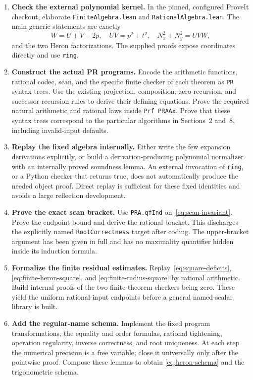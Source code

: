 \documentclass[11pt,a4paper]{article}
\theoremstyle{definition}
\newcommand{\code}[1]{\texttt{\small #1}}
\numberwithin{equation}{section}
\begin{document}
\begin{enumerate}
\item \textbf{Check the external polynomial kernel.}
In the pinned, configured ProveIt checkout, elaborate
\code{FiniteAlgebra.lean} and \code{RationalAlgebra.lean}.
The main generic statements are exactly
\[
 W=U+V-2p,\quad UV=p^2+t^2,\quad
 N_x^2+N_y^2=UVW,
\]
and the two Heron factorizations. The supplied proofs expose
coordinates directly and use \code{ring}.

\item \textbf{Construct the actual PR programs.}
Encode the arithmetic functions, rational codec, scan, and the
specific finite checker of each theorem as \code{PR} syntax trees.
Use the existing projection, composition, zero-recursion, and
successor-recursion rules to derive their defining equations.
Prove the required natural arithmetic and rational laws inside
\code{Prf PRAAx}. Prove that these syntax trees correspond to the
particular algorithms in Sections~2 and~8, including invalid-input
defaults.

\item \textbf{Replay the fixed algebra internally.}
Either write the few expansion derivations explicitly, or build a
derivation-producing polynomial normalizer with an internally
proved soundness lemma. An external invocation of \code{ring},
or a Python checker that returns true, does not automatically
produce the needed object proof. Direct replay is sufficient for
these fixed identities and avoids a large reflection development.

\item \textbf{Prove the exact scan bracket.}
Use \code{PRA.qfInd} on~\eqref{eq:scan-invariant}. Prove the
endpoint bound and derive the rational bracket. This discharges
the explicitly named \code{RootCorrectness} target after coding.
The upper-bracket argument has been given in full and has no
maximality quantifier hidden inside its induction formula.

\item \textbf{Formalize the finite residual estimates.}
Replay~\eqref{eq:square-deficits},
\eqref{eq:finite-heron-square}, and
\eqref{eq:finite-radius-square} by rational arithmetic.
Build internal proofs of the two finite theorem checkers being
zero. These yield the uniform rational-input endpoints before a
general named-scalar library is built.

\item \textbf{Add the regular-name schema.}
Implement the fixed program transformations, the equality and
order formulas, rational tightening, operation regularity, inverse
correctness, and root uniqueness. At each step the numerical
precision is a free variable; close it universally only after
the pointwise proof. Compose these lemmas to obtain
\eqref{eq:heron-schema} and the trigonometric schema.


\end{enumerate}
\end{document}
